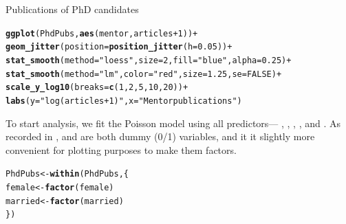 \documentclass[11pt]{book}\usepackage[]{graphicx}\usepackage[]{color}
\makeatletter
\newcommand{\hlnum}[1]{\textcolor[rgb]{0.686,0.059,0.569}{#1}}%
\newcommand{\hlstr}[1]{\textcolor[rgb]{0.192,0.494,0.8}{#1}}%
\newcommand{\hlopt}[1]{\textcolor[rgb]{0,0,0}{#1}}%
\newcommand{\hlstd}[1]{\textcolor[rgb]{0.345,0.345,0.345}{#1}}%
\newcommand{\hlkwb}[1]{\textcolor[rgb]{0.69,0.353,0.396}{#1}}%
\newcommand{\hlkwc}[1]{\textcolor[rgb]{0.333,0.667,0.333}{#1}}%
\newcommand{\hlkwd}[1]{\textcolor[rgb]{0.737,0.353,0.396}{\textbf{#1}}}%
\newenvironment{kframe}{%
 \def\at@end@of@kframe{}%
 \ifinner\ifhmode%
  \def\at@end@of@kframe{\end{minipage}}%
  \begin{minipage}{\columnwidth}%
 \fi\fi%
 \def\FrameCommand##1{\hskip\@totalleftmargin \hskip-\fboxsep
 \colorbox{shadecolor}{##1}\hskip-\fboxsep
     \hskip-\linewidth \hskip-\@totalleftmargin \hskip\columnwidth}%
 \MakeFramed {\advance\hsize-\width
   \@totalleftmargin\z@ \linewidth\hsize
   \@setminipage}}%
 {\par\unskip\endMakeFramed%
 \at@end@of@kframe}
\newenvironment{knitrout}{}{} %
\renewenvironment{knitrout}{\small\renewcommand{\baselinestretch}{.85}}{} %
\makeatother
\begin{document}
\begin{Example}[phdpubs1]{Publications of PhD candidates}
\begin{knitrout}
\color{fgcolor}\begin{kframe}
\begin{alltt}
\hlkwd{ggplot}\hlstd{(PhdPubs,} \hlkwd{aes}\hlstd{(mentor, articles}\hlopt{+}\hlnum{1}\hlstd{))} \hlopt{+}
  \hlkwd{geom_jitter}\hlstd{(}\hlkwc{position}\hlstd{=}\hlkwd{position_jitter}\hlstd{(}\hlkwc{h}\hlstd{=}\hlnum{0.05}\hlstd{))} \hlopt{+}
  \hlkwd{stat_smooth}\hlstd{(}\hlkwc{method}\hlstd{=}\hlstr{"loess"}\hlstd{,} \hlkwc{size}\hlstd{=}\hlnum{2}\hlstd{,} \hlkwc{fill}\hlstd{=}\hlstr{"blue"}\hlstd{,} \hlkwc{alpha}\hlstd{=}\hlnum{0.25}\hlstd{)} \hlopt{+}
        \hlkwd{stat_smooth}\hlstd{(}\hlkwc{method}\hlstd{=}\hlstr{"lm"}\hlstd{,} \hlkwc{color}\hlstd{=}\hlstr{"red"}\hlstd{,} \hlkwc{size}\hlstd{=}\hlnum{1.25}\hlstd{,} \hlkwc{se}\hlstd{=}\hlnum{FALSE}\hlstd{)} \hlopt{+}
        \hlkwd{scale_y_log10}\hlstd{(}\hlkwc{breaks}\hlstd{=}\hlkwd{c}\hlstd{(}\hlnum{1}\hlstd{,}\hlnum{2}\hlstd{,}\hlnum{5}\hlstd{,}\hlnum{10}\hlstd{,}\hlnum{20}\hlstd{))} \hlopt{+}
        \hlkwd{labs}\hlstd{(}\hlkwc{y} \hlstd{=} \hlstr{"log (articles+1)"}\hlstd{,} \hlkwc{x}\hlstd{=}\hlstr{"Mentor publications"}\hlstd{)}
\end{alltt}
\end{kframe}
\end{knitrout}


To start analysis, we fit the Poisson model using all predictors---
, , , , and
. As recorded in ,  and
 are both dummy (0/1) variables, and it it slightly
more convenient for plotting purposes to make them factors.

\begin{knitrout}
\color{fgcolor}\begin{kframe}
\begin{alltt}
\hlstd{PhdPubs} \hlkwb{<-} \hlkwd{within}\hlstd{(PhdPubs, \{}
  \hlstd{female} \hlkwb{<-} \hlkwd{factor}\hlstd{(female)}
  \hlstd{married} \hlkwb{<-} \hlkwd{factor}\hlstd{(married)}
\hlstd{\})}
\end{alltt}
\end{kframe}
\end{knitrout}


\end{Example}
\end{document}
